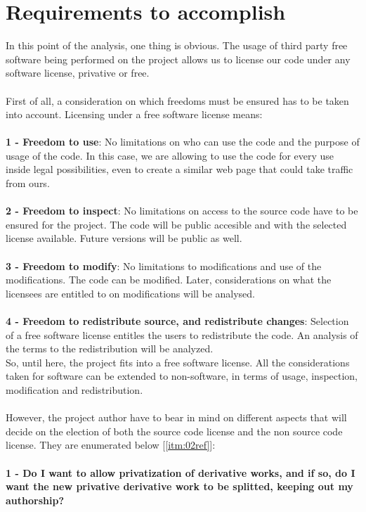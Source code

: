 \documentclass[11pt]{article}
\begin{document}
\newpage
\section{Requirements to accomplish}

In this point of the analysis, one thing is obvious. The usage of third party free software being performed on the project allows us to license our code under any software license, privative or free.\\
\\
First of all, a consideration on which freedoms must be ensured has to be taken into account. Licensing under a free software license means:\\
\\
\textbf{1 - Freedom to use}: No limitations on who can use the code and the purpose of usage of the code. In this case, we are allowing to use the code for every use inside legal possibilities, even to create a similar web page that could take traffic from ours.\\
\\
\textbf{2 - Freedom to inspect}: No limitations on access to the source code have to be ensured for the project. The code will be public accesible and with the selected license available. Future versions will be public as well.\\
\\
\textbf{3 - Freedom to modify}: No limitations to modifications and use of the modifications. The code can be modified. Later, considerations on what the licensees are entitled to on modifications will be analysed.\\
\\
\textbf{4 - Freedom to redistribute source, and redistribute changes}: Selection of a free software license entitles the users to redistribute the code. An analysis of the terms to the redistribution will be analyzed.\\
So, until here, the project fits into a free software license. All the considerations taken for software can be extended to non-software, in terms of usage, inspection, modification and redistribution.\\
\\
However, the project author have to bear in mind on different aspects that will decide on the election of both the source code license and the non source code license. They are enumerated below [\ref{itm:02ref}]:\\
\\
\textbf{1 - Do I want to allow privatization of derivative works, and if so, do I want the new privative derivative work to be splitted, keeping out my authorship?}\\
\end{document}
